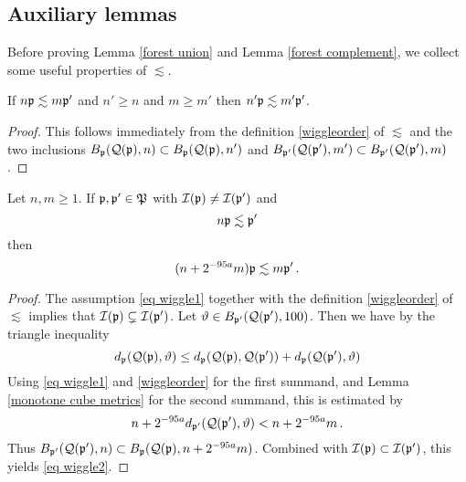 {\subsection{Auxiliary lemmas}
\label{subsec lessim aux}
Before proving Lemma \ref{forest union} and Lemma \ref{forest complement}, we collect some useful properties of $\lesssim$.

\begin{lemma}
    \label{wiggle order 1}
    If $n\mathfrak p \lesssim m\mathfrak p'$ and
    $n' \ge  n$ and $m \ge m'$ then $n'\mathfrak p \lesssim m'\mathfrak p'$.
\end{lemma}

\begin{proof}
    This follows immediately from the definition \eqref{wiggleorder} of $\lesssim$ and the two inclusions $B_{\mathfrak p}(\mathcal{Q}(\mathfrak p), n) \subset B_{\mathfrak p}(\mathcal{Q}(\mathfrak p), n')$ and $B_{\mathfrak p'}(\mathcal{Q}(\mathfrak p'), m') \subset B_{\mathfrak p'}(\mathcal{Q}(\mathfrak p'), m)$.
\end{proof}

\begin{lemma}
    \label{wiggle order 2}
    Let $n, m \ge 1$.
    If $\mathfrak p, \mathfrak p' \in \mathfrak P$ with $\mathcal{I}(\mathfrak p) \ne \mathcal{I}(\mathfrak p')$ and
    \begin{equation}
        \label{eq wiggle1}
        n \mathfrak p \lesssim \mathfrak p'
    \end{equation}
    then
    \begin{equation}
        \label{eq wiggle2}
        (n + 2^{-95 a} m) \mathfrak p \lesssim m\mathfrak p'\,.
    \end{equation}
\end{lemma}

\begin{proof}
    The assumption \eqref{eq wiggle1} together with the definition \eqref{wiggleorder} of $\lesssim$ implies that $\mathcal{I}(\mathfrak p) \subsetneq \mathcal{I}(\mathfrak p')$. Let $\vartheta \in B_{\mathfrak p'}(\mathcal{Q}(\mathfrak p'), 100)$.  Then we have by the triangle inequality
    $$
        d_{\mathfrak p}(\mathcal{Q}(\mathfrak p), \vartheta) \le  d_{\mathfrak p}(\mathcal{Q}(\mathfrak p), \mathcal{Q}(\mathfrak p')) +  d_{\mathfrak p}(\mathcal{Q}(\mathfrak p'), \vartheta)
    $$
    Using \eqref{eq wiggle1} and \eqref{wiggleorder} for the first summand, and Lemma \ref{monotone cube metrics} for the second summand, this is estimated by
    $$
        n + 2^{-95a} d_{\mathfrak p'}(\mathcal{Q}(\mathfrak p'), \vartheta) < n + 2^{-95a} m\,.
    $$
    Thus $B_{\mathfrak p'}(\mathcal{Q}(\mathfrak p'),n) \subset B_{\mathfrak p}(\mathcal{Q}(\mathfrak p),n + 2^{-95a}m)$. Combined with $\mathcal{I}(\mathfrak p) \subset \mathcal{I}(\mathfrak p')$, this yields \eqref{eq wiggle2}.
\end{proof}

}
